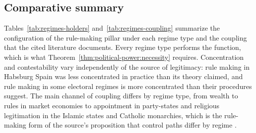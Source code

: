 \documentclass[11pt,letterpaper]{article}
\theoremstyle{definition}
\theoremstyle{remark}
\begin{document}
\subsection{Comparative summary}

Tables~\ref{tab:regimes-holders} and~\ref{tab:regimes-coupling} summarize the configuration of the rule-making pillar under each regime type and the coupling that the cited literature documents. Every regime type performs the function, which is what Theorem~\ref{thm:political-power:necessity} requires. Concentration and contestability vary independently of the source of legitimacy: rule making in Habsburg Spain was less concentrated in practice than its theory claimed, and rule making in some electoral regimes is more concentrated than their procedures suggest. The main channel of coupling differs by regime type, from wealth to rules in market economies to appointment in party-states and religious legitimation in the Islamic states and Catholic monarchies, which is the rule-making form of the source's proposition that control paths differ by regime \citep[Proposition~3]{largo2026hbs}.
\end{document}
